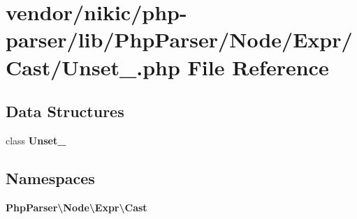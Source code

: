 \section{vendor/nikic/php-\/parser/lib/\+Php\+Parser/\+Node/\+Expr/\+Cast/\+Unset\+\_\+.php File Reference}
\label{_expr_2_cast_2_unset___8php}
\subsection*{Data Structures}
\begin{DoxyCompactItemize}
\item 
class {\bf Unset\+\_\+}
\end{DoxyCompactItemize}
\subsection*{Namespaces}
\begin{DoxyCompactItemize}
\item 
 {\bf Php\+Parser\textbackslash{}\+Node\textbackslash{}\+Expr\textbackslash{}\+Cast}
\end{DoxyCompactItemize}
